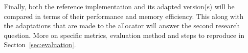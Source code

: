 Finally, both the reference implementation and its adapted version(s) will be compared in terms of their performance and memory efficiency. This along with the adaptations that are made to the allocator will answer the second research question. More on specific metrics, evaluation method and steps to reproduce in Section~\ref{sec:evaluation}.



